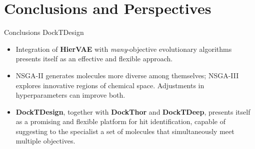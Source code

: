 \documentclass[aspectratio=169,xcolor=dvipsnames]{beamer}
\begin{document}
\section{Conclusions and Perspectives}


\begin{frame}{Conclusions \hfill {\footnotesize \alert{DockTDesign}}}

    \begin{itemize}
        \item Integration of \textbf{HierVAE} with \textit{many}-objective evolutionary algorithms presents itself as an effective and flexible approach.


        \item NSGA-II generates molecules more diverse among themselves; NSGA-III explores innovative regions of chemical space. Adjustments in hyperparameters can improve both.


        \item \textbf{DockTDesign}, together with \textbf{DockThor} and \textbf{DockTDeep}, presents itself as a promising and flexible platform for hit identification, capable of suggesting to the specialist a set of molecules that simultaneously meet multiple objectives.

    \end{itemize}

\end{frame}


\end{document}
